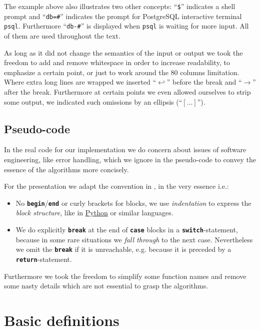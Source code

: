 The example above also illustrates two other concepts: ``\texttt{\$}''
indicates a shell prompt and ``\texttt{db=\#}'' indicates the prompt
for PostgreSQL interactive terminal \texttt{psql}. Furthermore
``\texttt{db-\#}'' is displayed when \texttt{psql} is waiting for more
input. All of them are used throughout the text.

As long as it did not change the semantics of the input or output we
took the freedom to add and remove whitespace in order to increase
readability, to emphasize a certain point, or just to work around the
80 columns limitation.  Where extra long lines are wrapped we inserted
``$\hookleftarrow$'' before the break and ``$\rightarrow$'' after the break.
Furthermore at certain points we even allowed ourselves to strip some
output, we indicated such omissions by an ellipsis (``$[\ldots]$'').

\subsection{Pseudo-code}
In the real code for our implementation we do concern about issues of
software engineering, like error handling, which we ignore in the
pseudo-code to convey the essence of the algorithms more concisely.

For the presentation we adapt the convention in
\citep[Page~19]{Cormen2001}, in the very essence i.e.:

\begin{itemize}
\item 
No \texttt{\textbf{begin}}/\texttt{\textbf{end}} or curly brackets for
blocks, we use \emph{indentation} to express the \emph{block
structure}, like in \href{http://www.python.org/}{Python} or similar languages.

\item 
We do explicitly \texttt{\textbf{break}} at the end of
\texttt{\textbf{case}} blocks in a \texttt{\textbf{switch}}-statement,
because in some rare situations we \emph{fall through} to the next
case. Nevertheless we omit the \texttt{\textbf{break}} if it is
unreachable, e.g. because it is preceded by a
\texttt{\textbf{return}}-statement.
\end{itemize}

\noindent
Furthermore we took the freedom to simplify some function names and
remove some nasty details which are not essential to grasp the
algorithms.



\section{Basic definitions}

